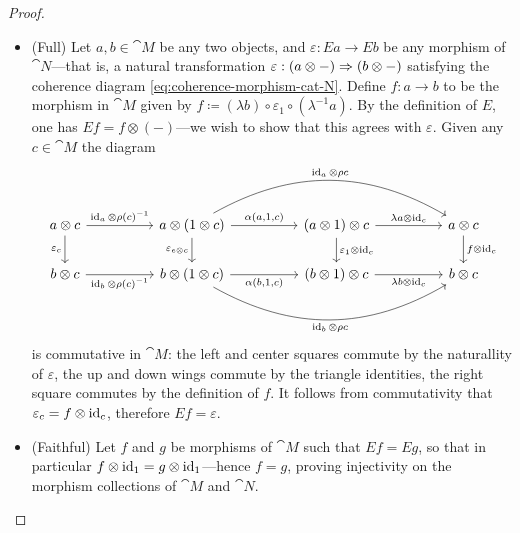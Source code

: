\documentclass[../../deep-dive]{subfiles}
\begin{document}
\begin{proof}
\begin{itemize}
        \item (Full) Let \(a, b \in \cat M\) be any two objects, and
              \(\varepsilon: E a \to E b\) be any morphism of \(\cat N\)---that is, a
              natural transformation \(\varepsilon: (a \otimes -) \Rightarrow (b \otimes -)\)
              satisfying the coherence diagram \cref{eq:coherence-morphism-cat-N}. Define
              \(f: a \to b\) to be the morphism in \(\cat M\) given by
              \(f \coloneq (\lambda b) \circ \varepsilon_1 \circ (\lambda^{-1} a)\). By the
              definition of \(E\), one has \(E f = f \otimes (-)\)---we wish to show that
              this agrees with \(\varepsilon\). Given any \(c \in \cat M\) the diagram
              \[
                  \begin{tikzcd}
                      a \otimes c \ar[rr, "{\Id_a \otimes \rho(c)^{-1}}"]
                      \ar[d, "\varepsilon_c"']
                      && a \otimes (1  \otimes c) \ar[rr, "{\alpha(a, 1, c)}"]
                      \ar[d, "\varepsilon_{e \otimes c}"']
                      \ar[rrrr, bend left=30, "{\Id_a \otimes \rho c}"]
                      && (a \otimes 1) \otimes c \ar[rr, "{\lambda a \otimes \Id_c}"]
                      \ar[d, "\varepsilon_1 \otimes \Id_c"]
                      && a \otimes c \ar[d, "f \otimes \Id_c"]
                      \\
                      b \otimes c \ar[rr, "{\Id_b \otimes \rho(c)^{-1}}"']
                      && b \otimes (1 \otimes c) \ar[rr, "{\alpha(b, 1, c)}"']
                      \ar[rrrr, bend right=30, "{\Id_b \otimes \rho c}"']
                      && (b \otimes 1) \otimes c \ar[rr, "{\lambda b \otimes \Id_c}"']
                      && b \otimes c
                  \end{tikzcd}
              \]
              is commutative in \(\cat M\): the left and center squares commute by the
              naturallity of \(\varepsilon\), the up and down wings commute by the triangle
              identities, the right square commutes by the definition of \(f\). It follows
              from commutativity that \(\varepsilon_c = f \otimes \operatorname{id}_c\), therefore
              \(E f = \varepsilon\).

        \item (Faithful) Let \(f\) and \(g\) be morphisms of \(\cat M\) such that \(E f
              = E g\), so that in particular \(f \otimes \operatorname{id}_1 = g \otimes \operatorname{id}_1\)---hence
              \(f = g\), proving injectivity on the morphism collections of \(\cat M\) and
              \(\cat N\).


\end{itemize}
\end{proof}
\end{document}
